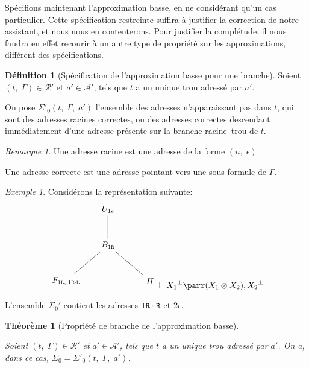 \documentclass[11pt,a4paper]{article}
\theoremstyle{plain}
\newtheorem{theorem}{Théorème}
\theoremstyle{definition}
\newtheorem{definition}{Définition}
\theoremstyle{remark}
\newtheorem{remark}{Remarque}
\newtheorem{example}{Exemple}
\newcommand*{\orth}{^\perp}
\newcommand*{\tensor}{\otimes}
\newcommand*{\sequent}{\Gamma}
\newcommand*{\Left}{\textnormal{\texttt{L}}}
\newcommand*{\Right}{\textnormal{\texttt{R}}}
\newcommand*{\treeaddresses}{\ensuremath{\mathcal{A'}}}
\newcommand*{\representationspartial}{\ensuremath{\mathcal{R'}}}
\newcommand*{\lowapprox}{\ensuremath{\Sigma_0}}
\newcommand*{\lowapproxspec}{\ensuremath{\Sigma'_0}}
\begin{document}
Spécifions maintenant l'approximation basse, en ne considérant qu'un cas particulier. Cette spécification restreinte suffira à justifier la correction de notre assistant, et nous nous en contenterons. Pour justifier la complétude, il nous faudra en effet recourir à un autre type de propriété sur les approximations, différent des spécifications.

\begin{definition}[Spécification de l'approximation basse pour une branche]
    \label{lowapprox_branch}
    Soient $(t, \; \sequent) \in \representationspartial$ et $a' \in \treeaddresses$, tels que $t$ a un unique trou adressé par $a'$.

    On pose $\lowapproxspec \left( t, \; \sequent, \; a' \right)$ l'ensemble des adresses n'apparaissant pas dans $t$, qui sont des adresses racines correctes, ou des adresses correctes descendant immédiatement d'une adresse présente sur la branche racine--trou de $t$.
\end{definition}

\begin{remark}
    Une adresse racine est une adresse de la forme $(n, \; \epsilon)$.
    
    Une adresse correcte est une adresse pointant vers une sous-formule de $\sequent$.
\end{remark}

\begin{example}Considérons la représentation suivante:
    \begin{equation*}
        \begin{tikzpicture}%
            [level 2/.style={sibling distance=3.5cm}]
            \node {$U_{1 \epsilon}$}
            child {node {$B_{1 \Right}$}
                child {node {$F_{1 \Left, \; 1 \Right \cdot \Left}$}}
                child {node {$H$}}
            };
        \end{tikzpicture}
        \vdash {X_1}\orth \parr (X_1 \tensor X_2), {X_2}\orth
    \end{equation*}

    L'ensemble $\lowapprox'$ contient les adresses $1 \Right \cdot \Right$ et $2 \epsilon$.
\end{example}
    
\begin{theorem}[Propriété de branche de l'approximation basse]
    \label{lowapprox_correction}
    
    Soient $(t, \; \sequent) \in \representationspartial$ et $a' \in \treeaddresses$, tels que $t$ a un unique trou adressé par $a'$.
    On a, dans ce cas, $\lowapprox = \lowapproxspec \left( t, \; \sequent, \; a' \right)$. 
\end{theorem}
\end{document}
